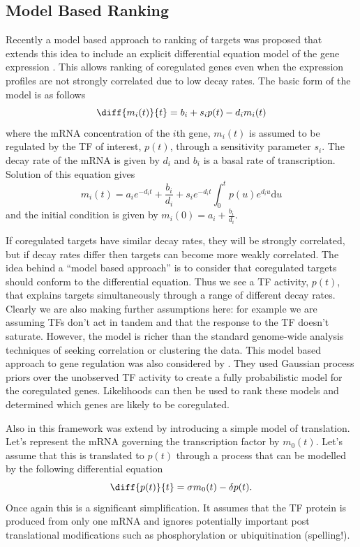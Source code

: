 \documentclass{article}
\begin{document}
\subsection{Model Based Ranking}

Recently a  model based  approach to ranking  of targets  was proposed
that extends  this idea to  include an explicit  differential equation
model of  the gene expression \cite{Barenco:ranked06}. This  allows ranking of
coregulated genes  even when the expression profiles  are not strongly
correlated due to  low decay rates. The basic form of  the model is as
follows
\begin{equation}
  \diff{m_i(t)}{t} = b_i + s_i p(t) - d_i m_i(t)
\end{equation}
where the mRNA concentration of the $i$th gene, $m_i(t)$ is assumed to
be  regulated by  the TF  of interest,  $p(t)$, through  a sensitivity
parameter $s_i$.  The decay  rate of  the mRNA is  given by  $d_i$ and
$b_i$  is a  basal rate  of transcription.  Solution of  this equation
gives
\begin{equation}
  m_i(t) = a_i e^{-d_it} + \frac{b_i}{d_i} + s_i
  e^{-d_it}\int_0^tp(u)e^{d_i u}\mathrm{d} u \label{eq:linearOperator}
\end{equation}
and the initial condition is given by $m_i(0)=a_i + \frac{b_i}{d_i}$. 

If coregulated targets have similar decay rates, they will be strongly
correlated, but  if decay  rates differ then  targets can  become more
weakly correlated.  The  idea behind a ``model based  approach'' is to
consider that  coregulated targets should conform  to the differential
equation. Thus  we see  a TF activity,  $p(t)$, that  explains targets
simultaneously through  a range of different decay  rates.  Clearly we
are also making further assumptions  here: for example we are assuming
TFs  don't act  in tandem  and  that the  response to  the TF  doesn't
saturate. However,  the model is  richer than the  standard genome-wide
analysis   techniques  of  seeking   correlation  or   clustering  the
data. This model based approach to gene regulation was also considered
by  \cite{Gao:latent08}. They  used Gaussian  process priors  over the
unobserved TF activity  to create a fully probabilistic  model for the
coregulated genes.  Likelihoods can then  be used to rank these models
and determined which genes are likely to be coregulated.

Also in \cite{Gao:latent08} this framework was extend by introducing a
simple model  of translation.  Let's represent the  mRNA governing the
transcription factor by $m_0(t)$. Let's assume that this is translated
to  $p(t)$ through a  process that  can be  modelled by  the following
differential equation
\begin{equation}
  \diff{p(t)}{t} = \sigma m_0(t) - \delta p(t).
\end{equation}
Once again this  is a significant simplification. It  assumes that the
TF  protein is  produced from  only one  mRNA and  ignores potentially
important post translational  modifications such as phosphorylation or
ubiquitination (spelling!).
\end{document}
